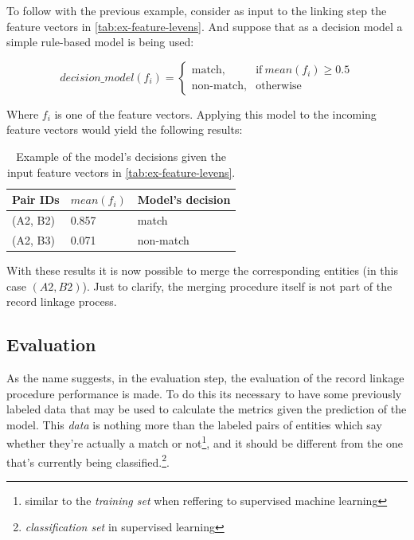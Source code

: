 \documentclass[epsfig,a4paper,11pt,titlepage,twoside,openany]{book}
\begin{document}
To follow with the previous example, consider as input to the linking step
the feature vectors in \autoref{tab:ex-feature-levens}. And suppose that as a
decision model a simple rule-based model is being used:

\begin{equation*}
  decision\_model(f_i) =
  \begin{cases}
    \text{match}, & \text{if}\ mean(f_i) \geq 0.5  \\
    \text{non-match}, & \text{otherwise}
  \end{cases}
\end{equation*}

Where $f_i$ is one of the feature vectors. Applying this model to the incoming
feature vectors would yield the following results:

\begin{table}[H]
  \centering
  \begin{tabular}{l|l|l}
    Pair IDs & $mean(f_i)$ & Model's decision \\ \hline
    (A2, B2) & 0.857       & match            \\
    (A2, B3) & 0.071       & non-match           
  \end{tabular}
  \caption{Example of the model's decisions given the input feature vectors in
    \autoref{tab:ex-feature-levens}.}
  \label{tab:ex-linking}
\end{table}

With these results it is now possible to merge the corresponding entities (in this case
$(A2, B2)$). Just to clarify, the merging procedure itself is not part of the
record linkage process.

\subsection{Evaluation}
\label{sec:rl-workflow-evaluation}

As the name suggests, in the evaluation step, the evaluation of the record linkage procedure performance is made. To do this its necessary to have some previously labeled data that  may  be used to calculate the metrics given the prediction of the model. This
\textit{data} is nothing more than the labeled pairs of entities which say whether
they're actually a match or not\footnote{similar to the \textit{training set} when reffering to supervised machine learning}, and it should be different
from the one that’s currently being classified.\footnote{\textit{classification
    set} in supervised learning}.
\end{document}
